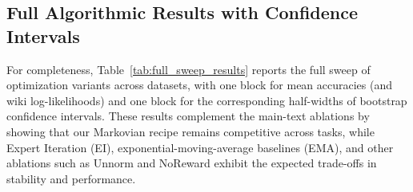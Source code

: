 \documentclass{article} %
\begin{document}
\subsection{Full Algorithmic Results with Confidence Intervals}

For completeness, Table~\ref{tab:full_sweep_results} reports the full sweep of optimization variants across datasets, with one block for mean accuracies (and wiki log-likelihoods) and one block for the corresponding half-widths of bootstrap confidence intervals. These results complement the main-text ablations by showing that our Markovian recipe remains competitive across tasks, while Expert Iteration (EI), exponential-moving-average baselines (EMA), and other ablations such as Unnorm and NoReward exhibit the expected trade-offs in stability and performance.
\end{document}
